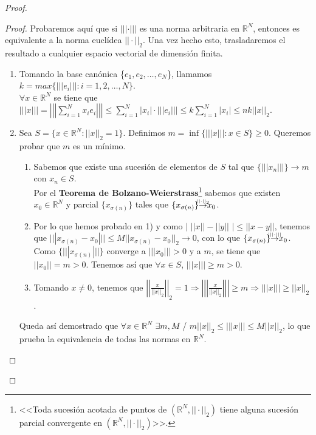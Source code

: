 \documentclass[a4paper, 11pt]{article} %
\begin{document}
\begin{enumerate}
\begin{proof}
		\begin{proof}
			Probaremos aquí que si $|||\cdot|||$ es una norma arbitraria en $\mathbb{R}^N$, entonces es equivalente a la norma euclídea $||\cdot||_2$. Una vez hecho esto, trasladaremos el resultado a cualquier espacio vectorial de dimensión finita.
			\begin{enumerate}[label=\arabic*)]
				\item Tomando la base canónica \{$e_1, e_2,\dots,e_N$\}, llamamos $k=max\{|||e_i|||: i = 1,2,\dots,N\}$. \\
				$\forall x \in \mathbb{R}^N$ se tiene que $|||x||| = \left|\left|\left|\sum_{i=1}^{N} x_i e_i\right|\right|\right| \le \sum_{i=1}^{N} |x_i| \cdot |||e_i||| \le k \sum_{i=1}^{N} |x_i| \le nk||x||_2$.
				\item Sea $S = \{x \in \mathbb{R}^N: ||x||_2 = 1\}$. Definimos $m = \inf \{|||x|||: x \in S\} \ge 0$. Queremos probar que $m$ es un mínimo.
				\begin{enumerate}[label=\alph*)]
					\item Sabemos que existe una sucesión de elementos de $S$ tal que $\{|||x_n|||\} \rightarrow m$ con $x_n \in S$.\\
					Por el \textbf{Teorema de Bolzano-Weierstrass}\footnote[11]{<<Toda sucesión acotada de puntos de $(\mathbb{R}^N,||\cdot||_2)$ tiene alguna sucesión parcial convergente en $(\mathbb{R}^N, ||\cdot||_2)$>>.} sabemos que existen $x_0 \in \mathbb{R}^N$ y parcial $\{x_{\sigma(n)}\}$ tales que $\{x_{\sigma(n)}\} \accentset{||\cdot||_2} \rightarrow x_0$.
					\item Por lo que hemos probado en 1) y como $|$ $||x||-||y||$ $| \le ||x-y||$, tenemos que $|||x_{\sigma(n)}-x_0||| \le M ||x_{\sigma(n)}-x_0||_2 \rightarrow 0$, con lo que $\{x_{\sigma(n)}\} \accentset{|||\cdot|||} \rightarrow x_0$. Como $\{|||x_{\sigma(n)}|||\}$ converge a $|||x_0||| > 0$ y a $m$, se tiene que $||x_0|| = m > 0$. Tenemos así que $\forall x \in S$, $|||x||| \ge m > 0$.
					\item Tomando $x \neq 0$, tenemos que $\left|\left| \frac{x}{||x||_2} \right|\right|_2 = 1 \Rightarrow \left|\left|\left| \frac{x}{||x||_2} \right|\right|\right| \ge m \Rightarrow |||x||| \ge ||x||_2$.
				\end{enumerate}
				
				Queda así demostrado que $\forall x \in \mathbb{R}^N$ $\exists m, M$  /  $m||x||_2 \le |||x||| \le M||x||_2$, lo que prueba la equivalencia de todas las normas en $\mathbb{R}^N$.
			\end{enumerate}
		\end{proof}
		

\end{proof}
\end{enumerate}
\end{document}
